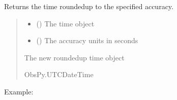 \documentclass[letterpaper,10pt,english]{sphinxmanual}
\begin{document}

\begin{fulllineitems}
\label{\detokenize{api_core:core.utils.time_ceil}}
\pysigstartsignatures
{}
\pysigstopsignatures
\sphinxAtStartPar
Returns the time rounded\sphinxhyphen{}up to the specified accuracy.
\begin{quote}\begin{description}
\begin{itemize}
\item {} 
\sphinxAtStartPar
{} () \textendash{} The time object

\item {} 
\sphinxAtStartPar
{} () \textendash{} The accuracy units in seconds

\end{itemize}

\sphinxAtStartPar
The new rounded\sphinxhyphen{}up time object

\sphinxAtStartPar
ObsPy.UTCDateTime

\end{description}\end{quote}

\sphinxAtStartPar
Example:


\end{fulllineitems}
\end{document}
